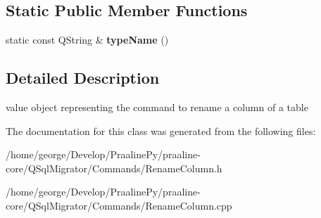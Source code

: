 \subsection*{Static Public Member Functions}
\begin{DoxyCompactItemize}
\item 
\mbox{\label{class_q_sql_migrator_1_1_commands_1_1_rename_column_af7271bb78b739e4e1a713e60197cb650}} 
static const Q\+String \& {\bfseries type\+Name} ()
\end{DoxyCompactItemize}


\subsection{Detailed Description}
value object representing the command to rename a column of a table 

The documentation for this class was generated from the following files\+:\begin{DoxyCompactItemize}
\item 
/home/george/\+Develop/\+Praaline\+Py/praaline-\/core/\+Q\+Sql\+Migrator/\+Commands/Rename\+Column.\+h\item 
/home/george/\+Develop/\+Praaline\+Py/praaline-\/core/\+Q\+Sql\+Migrator/\+Commands/Rename\+Column.\+cpp\end{DoxyCompactItemize}
